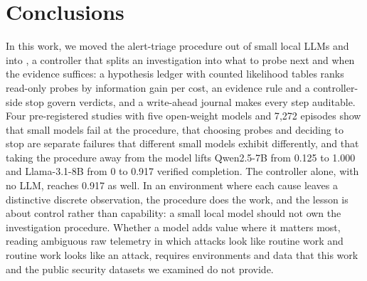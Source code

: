 \section{Conclusions}
\label{sec:conclusion}

In this work, we moved the alert-triage procedure out of small local LLMs and into \hesp{}, a controller that splits an investigation into what to probe next and when the evidence suffices: a hypothesis ledger with counted likelihood tables ranks read-only probes by information gain per cost, an evidence rule and a controller-side stop govern verdicts, and a write-ahead journal makes every step auditable. Four pre-registered studies with five open-weight models and 7{,}272 episodes show that small models fail at the procedure, that choosing probes and deciding to stop are separate failures that different small models exhibit differently, and that taking the procedure away from the model lifts Qwen2.5-7B from 0.125 to 1.000 and Llama-3.1-8B from 0 to 0.917 verified completion. The controller alone, with no LLM, reaches 0.917 as well. In an environment where each cause leaves a distinctive discrete observation, the procedure does the work, and the lesson is about control rather than capability: a small local model should not own the investigation procedure. Whether a model adds value where it matters most, reading ambiguous raw telemetry in which attacks look like routine work and routine work looks like an attack, requires environments and data that this work and the public security datasets we examined do not provide.
